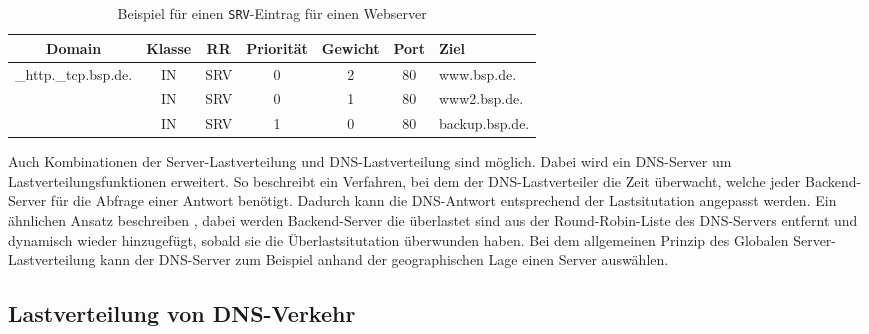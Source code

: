 \documentclass[a4paper, 12pt, BCOR10mm, DIV12, toc=bibliography, toc=listof, german]{scrbook}
\begin{document}
			\begin{table}
				\centering
				\begin{tabular}{|ccccccl|}\hline
				 Domain & Klasse & RR & Priorität & Gewicht & Port & Ziel \\\hline\hline
					\_http.\_tcp.bsp.de. & IN & SRV & 0 & 2 & 80 & www.bsp.de. \\	
					& IN & SRV & 0 & 1 & 80 & www2.bsp.de. \\	
					& IN & SRV & 1 & 0 & 80 & backup.bsp.de. \\\hline
				\end{tabular}
				\caption{Beispiel für einen \texttt{SRV}-Eintrag für einen Webserver}
				\label{tab:srv}
			\end{table}

			Auch Kombinationen der Server-Lastverteilung und DNS-Lastverteilung sind möglich. Dabei wird ein
			DNS-Server um Lastverteilungsfunktionen erweitert. So beschreibt \cite{chyuyi2003} ein
			Verfahren, bei dem der DNS-Lastverteiler die Zeit überwacht, welche jeder Backend-Server für
			die Abfrage einer Antwort benötigt. Dadurch kann die DNS-Antwort entsprechend der
			Lastsitutation angepasst werden. Ein ähnlichen Ansatz beschreiben \cite{mookim2005}, dabei
			werden Backend-Server die überlastet sind aus der Round-Robin-Liste des DNS-Servers entfernt
			und dynamisch wieder hinzugefügt, sobald sie die Überlastsitutation überwunden haben. Bei dem
			allgemeinen Prinzip des Globalen Server-Lastverteilung \cite{bourke2001} kann der DNS-Server
			zum Beispiel anhand der geographischen Lage einen Server auswählen.

			
			\subsection*{Lastverteilung von DNS-Verkehr} %
\end{document}
